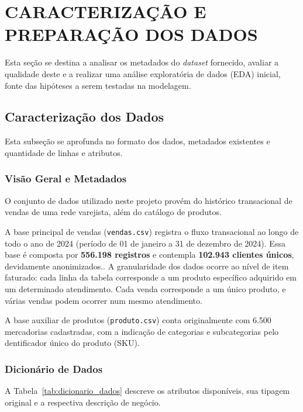 \section{CARACTERIZAÇÃO E PREPARAÇÃO DOS DADOS}\label{sec:conteudo2}

Esta seção se destina a analisar os metadados do \textit{dataset} fornecido, avaliar a qualidade deste e a realizar uma análise exploratória de dados (EDA) inicial, fonte das hipóteses a serem testadas na modelagem.

\subsection{Caracterização dos Dados}\label{subsec:caracterizacao}

Esta subseção se aprofunda no formato dos dados, metadados existentes e quantidade de linhas e atributos.

\subsubsection{Visão Geral e Metadados}
O conjunto de dados utilizado neste projeto provém do histórico transacional de vendas de uma rede varejista, além do catálogo de produtos. 

A base principal de vendas (\texttt{vendas.csv}) registra o fluxo transacional ao longo de todo o ano de 2024 (período de 01 de janeiro a 31 de dezembro de 2024). Essa base é composta por \textbf{556.198 registros} e contempla \textbf{102.943 clientes únicos}, devidamente anonimizados.. 
A granularidade dos dados ocorre ao nível de item faturado: cada linha da tabela corresponde a um produto específico adquirido em um determinado atendimento.
Cada venda corresponde a um único produto, e várias vendas podem ocorrer num mesmo atendimento.

A base auxiliar de produtos (\texttt{produto.csv}) conta originalmente com 6.500 mercadorias cadastradas, com a indicação de categorias e subcategorias pelo dentificador único do produto (SKU).

\subsubsection{Dicionário de Dados}
A Tabela~\ref{tab:dicionario_dados} descreve os atributos disponíveis, sua tipagem original e a respectiva descrição de negócio.



